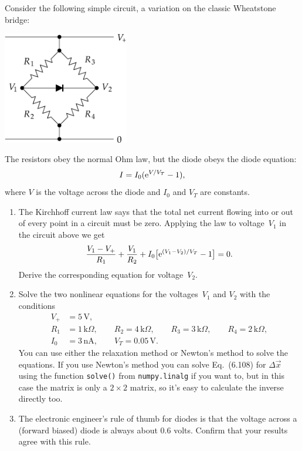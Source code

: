 \documentclass[12pt]{article}
\begin{document}
\begin{exercises}
\newpage
Consider the following simple circuit, a variation on the classic
Wheatstone bridge:
\smallskip
\begin{center}
\includegraphics[width=5.5cm]{nlcircuit.eps}
\end{center}
The resistors obey the normal Ohm law, but the diode obeys the diode
equation:
\begin{displaymath}
I = I_0 (\mathrm{e}^{V/V_T} - 1),
\end{displaymath}
where $V$ is the voltage across the diode and $I_0$ and $V_T$ are
constants.

\begin{enumerate}\setlength{\itemsep}{0pt}
\item The Kirchhoff current law says that the total net current flowing
  into or out of every point in a circuit must be zero.  Applying the law
  to voltage~$V_1$ in the circuit above we get
\begin{displaymath}
{V_1-V_+\over R_1} + {V_1\over R_2}
  + I_0\bigl[\mathrm{e}^{(V_1-V_2)/V_T} - 1\bigr] = 0.
\end{displaymath}
Derive the corresponding equation for voltage~$V_2$.
\item Solve the two nonlinear equations for the voltages~$V_1$ and $V_2$
  with the conditions
\begin{align*}
V_+ &= 5\,\textrm{V}, \\
R_1 &= 1\,\mathrm{k}\Omega, \qquad
R_2 = 4\,\mathrm{k}\Omega, \qquad
R_3 = 3\,\mathrm{k}\Omega, \qquad
R_4 = 2\,\mathrm{k}\Omega, \\
I_0 &= 3\,\textrm{nA},\qquad
V_T = 0.05\,\textrm{V}.
\end{align*}
You can use either the relaxation method or Newton's method to solve the
equations.  If you use Newton's method you can solve Eq.~(6.108) for
$\Delta\vec{x}$ using the function \verb|solve()| from \verb|numpy.linalg|
if you want to, but in this case the matrix is only a $2\times2$ matrix, so
it's easy to calculate the inverse directly too.
\item The electronic engineer's rule of thumb for diodes is that the
  voltage across a (forward biased) diode is always about 0.6 volts.
  Confirm that your results agree with this rule.
\end{enumerate}



\end{exercises}
\end{document}
